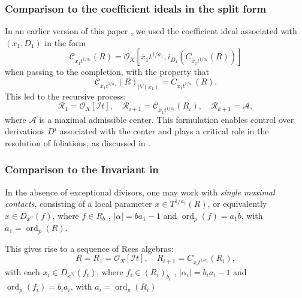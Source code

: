 \documentclass{amsart}
\newcommand{\cA}{{\mathcal A}}
\newcommand{\cI}{{\mathcal I}}
\newcommand{\cO}{{\mathcal O}}
\newcommand{\ord}{{\operatorname{ord}}}
\begin{document}
\subsubsection{Comparison to the   coefficient ideals in the split form}
\begin{remark} \label{previous}
In an earlier version of this paper \cite{W23}, we used the coefficient ideal  associated with $(\overline{x}_1,D_1)$ in the form
\[
\mathcal{C}_{\overline{x}_1 t^{1/a_1}}(R) = \mathcal{O}_X\left[\overline{x}_1 t^{1/a_1}, i_{D_1}\left(C_{\overline{x}_1 t^{1/a_1}}(R)\right)\right]
\]
when passing to the completion, with the property that
\[
\mathcal{C}_{\overline{x}_1 t^{1/a_1}}(R)_{|V(\overline{x}_1)} = C_{\overline{x}_1 t^{1/a_1}}(R).
\]
This led to the recursive process:
\[
\mathcal{R}_1 = \mathcal{O}_X[\mathcal{I} t], \quad \mathcal{R}_{i+1} = \mathcal{C}_{\overline{x}_1 t^{1/a_1}}(R_i), \quad \mathcal{R}_{k+1} = \mathcal{A},
\]
where $\mathcal{A}$ is a maximal admissible center. This formulation enables control over derivations $D^i$ associated with the center and plays a critical role in the resolution of foliations, as discussed in \cite{ABTW25}.
\end{remark}




\subsubsection{Comparison to the Invariant in \cite{ATW-weighted}}

In the absence of exceptional divisors, one may work with \emph{single maximal contacts}, consisting of a local parameter \( x \in T^{1/a_1}(R) \), or equivalently \( x \in D_{\overline{x}^\alpha}(f)\), where \( f  \in R_b \) ,  ${|\alpha| = b a_1 - 1}$ and  $\ord_p(f)=a_1b$, with $a_1=\ord_p(R)$.

This gives rise to a sequence of Rees algebras:
\[
R = R_1 = \mathcal{O}_X[\mathcal{I} t], \quad R_{i+1} = C_{x_i t^{1/a_i}}(R_i),
\]
with each  \( x_i \in D_{\overline{x}^{\alpha_i}}(f_i)\), where \( f_i  \in (R_i)_{b_i} \) ,  ${|\alpha_i| = b_i a_i - 1}$ and  $\ord_p(f_i)=b_ia_i$, with $a_i=\ord_p(R_i)$
\end{document}
